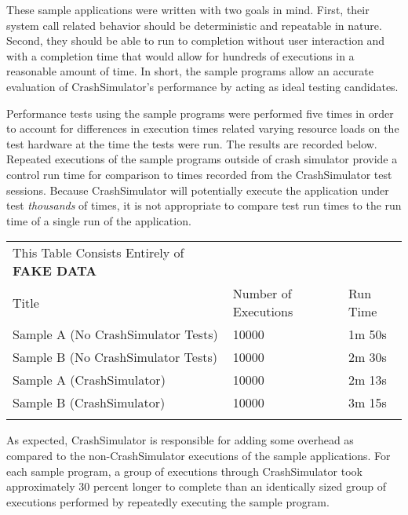             These sample applications were written with two goals in mind. First, their system call related behavior
            should be deterministic and repeatable in nature. Second, they should be able to run to completion without
            user interaction and with a completion time that would allow for hundreds of executions in a reasonable
            amount of time. In short, the sample programs allow an accurate evaluation of CrashSimulator's performance
            by acting as ideal testing candidates.

            Performance tests using the sample programs were performed five times in order to account for differences in
            execution times related varying resource loads on the test hardware at the time the tests were run. The
            results are recorded below. Repeated executions of the sample programs outside of crash simulator provide a
            control run time for comparison to times recorded from the CrashSimulator test sessions. Because
            CrashSimulator will potentially execute the application under test \emph{thousands} of times, it is not
            appropriate to compare test run times to the run time of a single run of the application.

            \begin{tabular} {l  l  l}
                \toprule{}
                This Table Consists Entirely of \textbf{FAKE DATA} \\
                Title & Number of Executions & Run Time \\
                Sample A (No CrashSimulator Tests) & 10000 & 1m 50s \\
                Sample B (No CrashSimulator Tests) & 10000 & 2m 30s \\
                Sample A (CrashSimulator) & 10000 & 2m 13s \\
                Sample B (CrashSimulator) & 10000 & 3m 15s \\
                \bottomrule{}
            \end{tabular}

            As expected, CrashSimulator is responsible for adding some overhead as compared to the non-CrashSimulator
            executions of the sample applications. For each sample program, a group of executions through CrashSimulator
            took approximately 30 percent longer to complete than an identically sized group of executions performed by
            repeatedly executing the sample program.

